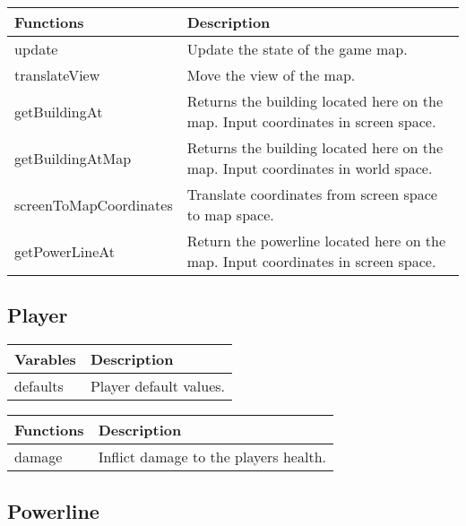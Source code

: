 	
	\begin{table}[H]
	\begin{tabular}{p{4cm} | p{8cm} }
	\hline
	\rowcolor{gray}
	Functions & Description \\ \hline
	update & Update the state of the game map. \\ \hline
	translateView & Move the view of the map. \\ \hline
	getBuildingAt & Returns the building located here on the map. Input coordinates in screen space. \\ \hline
	getBuildingAtMap & Returns the building located here on the map. Input coordinates in world space. \\ \hline
	screenToMapCoordinates & Translate coordinates from screen space to map space. \\ \hline
	getPowerLineAt & Return the powerline located here on the map. Input coordinates in screen space. \\ \hline
	\end{tabular}
	\end{table}
	

\subsection*{Player}

	\begin{table}[H]
	\begin{tabular}{p{4cm} | p{8cm} }
	\hline
	\rowcolor{gray}
	Varables & Description \\ \hline
	defaults & Player default values. \\ \hline
	\end{tabular}
	\end{table}

	\begin{table}[H]
	\begin{tabular}{p{4cm} | p{8cm} }
	\hline
	\rowcolor{gray}
	Functions & Description \\ \hline
	damage & Inflict damage to the players health. \\ \hline
	\end{tabular}
	\end{table}
	

\subsection*{Powerline}


